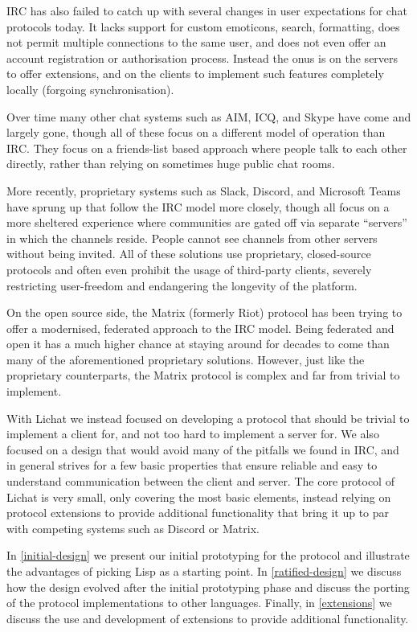 \documentclass[format=sigconf]{acmart}
\begin{document}
IRC has also failed to catch up with several changes in user expectations for chat protocols today. It lacks support for custom emoticons, search, formatting, does not permit multiple connections to the same user, and does not even offer an account registration or authorisation process. Instead the onus is on the servers to offer extensions, and on the clients to implement such features completely locally (forgoing synchronisation).

Over time many other chat systems such as AIM, ICQ, and Skype have come and largely gone, though all of these focus on a different model of operation than IRC. They focus on a friends-list based approach where people talk to each other directly, rather than relying on sometimes huge public chat rooms.

More recently, proprietary systems such as Slack, Discord, and Microsoft Teams have sprung up that follow the IRC model more closely, though all focus on a more sheltered experience where communities are gated off via separate ``servers'' in which the channels reside. People cannot see channels from other servers without being invited. All of these solutions use proprietary, closed-source protocols and often even prohibit the usage of third-party clients, severely restricting user-freedom and endangering the longevity of the platform.

On the open source side, the Matrix (formerly Riot) protocol has been trying to offer a modernised, federated approach to the IRC model. Being federated and open it has a much higher chance at staying around for decades to come than many of the aforementioned proprietary solutions. However, just like the proprietary counterparts, the Matrix protocol is complex and far from trivial to implement.

With Lichat we instead focused on developing a protocol that should be trivial to implement a client for, and not too hard to implement a server for. We also focused on a design that would avoid many of the pitfalls we found in IRC, and in general strives for a few basic properties that ensure reliable and easy to understand communication between the client and server. The core protocol of Lichat is very small, only covering the most basic elements, instead relying on protocol extensions to provide additional functionality that bring it up to par with competing systems such as Discord or Matrix.

In \autoref{initial-design} we present our initial prototyping for the protocol and illustrate the advantages of picking Lisp as a starting point. In \autoref{ratified-design} we discuss how the design evolved after the initial prototyping phase and discuss the porting of the protocol implementations to other languages. Finally, in \autoref{extensions} we discuss the use and development of extensions to provide additional functionality.
\end{document}
